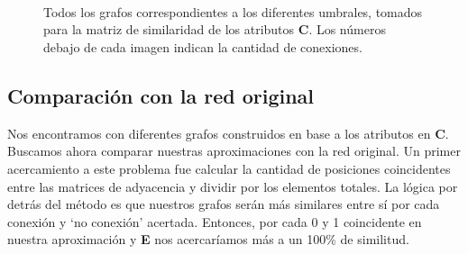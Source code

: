 \begin{figure}[!htbp]
    \centering
    \hfill
    \hfill
    \hfill
    \hfill
    \\[\smallskipamount]
    \hfill
    \hfill
    \hfill
    \hfill
    \\[\smallskipamount]
    \hfill    
    \hfill
    \hfill
    \hfill
    \\[\smallskipamount]
    \hfill
    \hfill
    \caption{Todos los grafos correspondientes a los diferentes umbrales, tomados para la matriz de similaridad de los atributos \textbf{C}. Los números debajo de cada imagen indican la cantidad de conexiones.}
    \label{grafos_aproximados}
\end{figure}

\vspace{1em}



\vspace{2em}
\subsection{Comparación con la red original}

Nos encontramos con diferentes grafos construidos en base a los atributos en \textbf{C}. Buscamos ahora comparar nuestras aproximaciones con la red original. 
Un primer acercamiento a este problema fue calcular la cantidad de posiciones coincidentes entre las matrices de adyacencia y dividir por los elementos totales. La lógica por detrás del método es que nuestros grafos serán más similares entre sí por cada conexión y `no conexión' acertada. Entonces, por cada 0 y 1 coincidente en nuestra aproximación y \textbf{E} nos acercaríamos más a un 100\% de similitud. 

